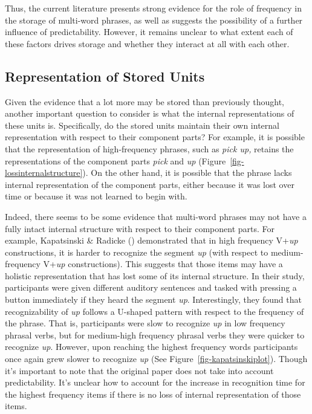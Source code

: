 \documentclass[
  12pt,
  letterpaper,
]{scrreprt}
\begin{document}
Thus, the current literature presents strong evidence for the role of
frequency in the storage of multi-word phrases, as well as suggests the
possibility of a further influence of predictability. However, it
remains unclear to what extent each of these factors drives storage and
whether they interact at all with each other.

\subsection{Representation of Stored
Units}\label{representation-of-stored-units}

Given the evidence that a lot more may be stored than previously
thought, another important question to consider is what the internal
representations of these units is. Specifically, do the stored units
maintain their own internal representation with respect to their
component parts? For example, it is possible that the representation of
high-frequency phrases, such as \emph{pick up,} retains the
representations of the component parts \emph{pick} and \emph{up}
(Figure~\ref{fig-lossinternalstructure}). On the other hand, it is
possible that the phrase lacks internal representation of the component
parts, either because it was lost over time or because it was not
learned to begin with.

Indeed, there seems to be some evidence that multi-word phrases may not
have a fully intact internal structure with respect to their component
parts. For example, Kapatsinski \& Radicke
()
demonstrated that in high frequency V+\emph{up} constructions, it is
harder to recognize the segment \emph{up} (with respect to
medium-frequency V+\emph{up} constructions). This suggests that those
items may have a holistic representation that has lost some of its
internal structure. In their study, participants were given different
auditory sentences and tasked with pressing a button immediately if they
heard the segment \emph{up}. Interestingly, they found that
recognizability of \emph{up} follows a U-shaped pattern with respect to
the frequency of the phrase. That is, participants were slow to
recognize \emph{up} in low frequency phrasal verbs, but for medium-high
frequency phrasal verbs they were quicker to recognize \emph{up}.
However, upon reaching the highest frequency words participants once
again grew slower to recognize \emph{up} (See
Figure~\ref{fig-kapatsinskiplot}). Though it's important to note that
the original paper does not take into account predictability. It's
unclear how to account for the increase in recognition time for the
highest frequency items if there is no loss of internal representation
of those items.
\end{document}
